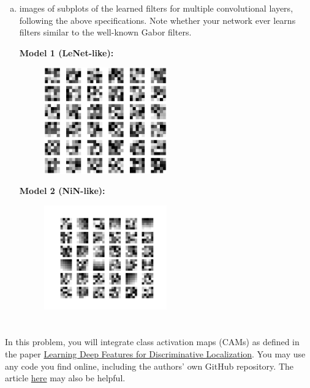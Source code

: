 \documentclass{article}[12pt]
\begin{document}
\begin{enumerate}[(a)]
    \item images of subplots of the learned filters for multiple convolutional layers, following the above specifications. Note whether your network ever learns filters similar to the well-known Gabor filters.

    \textbf{Model 1 (LeNet-like):}
    \begin{figure}[H]
        \centering
            \includegraphics[width=0.5\textwidth]{filter_oldmodel.png}
    \end{figure}
    \textbf{Model 2 (NiN-like):}
    \begin{figure}[H]
        \centering
            \includegraphics[width=0.5\textwidth]{filter_newmodel.png}
    \end{figure}


\end{enumerate}



\section{}

In this problem, you will integrate class activation maps (CAMs) as defined in the paper \href{https://arxiv.org/pdf/1512.04150.pdf}{Learning Deep Features for Discriminative Localization}. You may use any code you find online, including the authors' own GitHub repository. The article \href{https://debuggercafe.com/pytorch-class-activation-map-using-custom-trained-model/}{here} may also be helpful.
\end{document}
